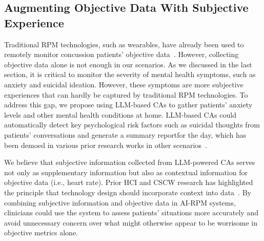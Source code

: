 



\subsection{Augmenting Objective Data With Subjective Experience}
Traditional RPM technologies, such as wearables, have already been used to remotely monitor concussion patients' objective data~\cite{yang2020bidirectional}.
However, collecting objective data alone is not enough in our scenarios.
As we discussed in the last section, it is critical to monitor the severity of mental health symptoms, such as anxiety and suicidal ideation.
However, these symptoms are more subjective experiences that can hardly be captured by traditional RPM technologies.
To address this gap, we propose using LLM-based CAs to gather patients' anxiety levels and other mental health conditions at home. 
LLM-based CAs could automatically detect key psychological risk factors such as suicidal thoughts from patients' conversations and generate a summary reportfor the day, which has been demoed in various prior research works in other scenarios~\cite{bartle2023machine, bartle2022second, wang2023enabling, simpson2020daisy, ma2024understanding, yang2023integrating}.


We believe that subjective information collected from LLM-powered CAs serves not only as supplementary information but also as contextual information for objective data (i.e., heart rate).
Prior HCI and CSCW research has highlighted the principle that technology design should incorporate context into data~\cite{dourish2004we, yoo2024missed}.
By combining subjective information and objective data in AI-RPM systems, clinicians could use the system to assess patients' situations more accurately and avoid unnecessary concern over what might otherwise appear to be worrisome in objective metrics alone. 


